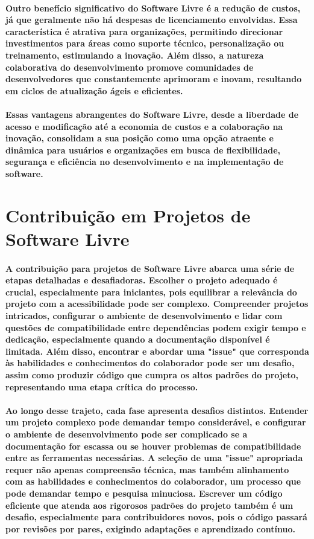 \documentclass[a4paper, 12pt]{article}
\begin{document}
\paragraph{Outro benefício significativo do Software Livre é a redução de custos, já que geralmente não há despesas de licenciamento envolvidas. Essa característica é atrativa para organizações, permitindo direcionar investimentos para áreas como suporte técnico, personalização ou treinamento, estimulando a inovação. Além disso, a natureza colaborativa do desenvolvimento promove comunidades de desenvolvedores que constantemente aprimoram e inovam, resultando em ciclos de atualização ágeis e eficientes.}
\paragraph{Essas vantagens abrangentes do Software Livre, desde a liberdade de acesso e modificação até a economia de custos e a colaboração na inovação, consolidam a sua posição como uma opção atraente e dinâmica para usuários e organizações em busca de flexibilidade, segurança e eficiência no desenvolvimento e na implementação de software.}

\section{Contribuição em Projetos de Software Livre}
\paragraph{A contribuição para projetos de Software Livre abarca uma série de etapas detalhadas e desafiadoras. Escolher o projeto adequado é crucial, especialmente para iniciantes, pois equilibrar a relevância do projeto com a acessibilidade pode ser complexo. Compreender projetos intricados, configurar o ambiente de desenvolvimento e lidar com questões de compatibilidade entre dependências podem exigir tempo e dedicação, especialmente quando a documentação disponível é limitada. Além disso, encontrar e abordar uma "issue" que corresponda às habilidades e conhecimentos do colaborador pode ser um desafio, assim como produzir código que cumpra os altos padrões do projeto, representando uma etapa crítica do processo.}
\paragraph{Ao longo desse trajeto, cada fase apresenta desafios distintos. Entender um projeto complexo pode demandar tempo considerável, e configurar o ambiente de desenvolvimento pode ser complicado se a documentação for escassa ou se houver problemas de compatibilidade entre as ferramentas necessárias. A seleção de uma "issue" apropriada requer não apenas compreensão técnica, mas também alinhamento com as habilidades e conhecimentos do colaborador, um processo que pode demandar tempo e pesquisa minuciosa. Escrever um código eficiente que atenda aos rigorosos padrões do projeto também é um desafio, especialmente para contribuidores novos, pois o código passará por revisões por pares, exigindo adaptações e aprendizado contínuo.}
\end{document}
